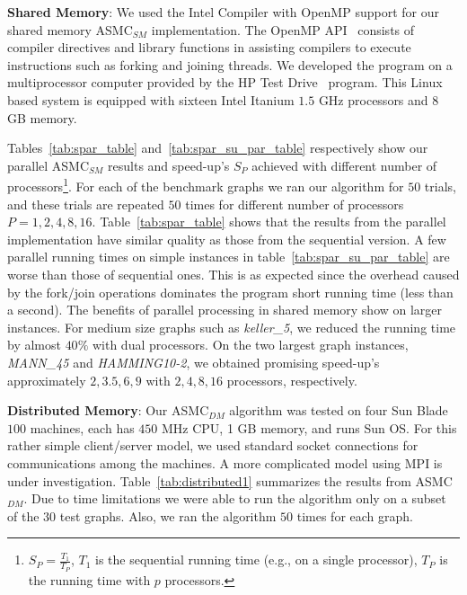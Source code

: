 \documentclass[11pt]{article}
\begin{document}
\textbf{Shared Memory}: We used the Intel Compiler with OpenMP support for our shared memory ASMC$_{SM}$ implementation. The OpenMP API~\cite{OpenMP} consists of compiler directives and library functions in assisting compilers to execute instructions such as forking and joining threads.  We developed the program on a multiprocessor computer provided by the HP Test Drive~\cite{HPTestDrive} program. This Linux based system is equipped with sixteen Intel Itanium $1.5$ GHz processors and $8$ GB memory.


Tables~\ref{tab:spar_table} and~\ref{tab:spar_su_par_table} respectively show our parallel ASMC$_{SM}$ results and speed-up's $S_P$ achieved with different number of processors\footnote{$S_P = \frac{T_1}{T_P}$, $T_1$ is the sequential running time (e.g., on a single processor), $T_P$ is the running time with $p$ processors.}. For each of the benchmark graphs we ran our algorithm for $50$ trials, and these trials are repeated $50$ times for different number of processors $P=1,2,4,8,16$.  Table~\ref{tab:spar_table} shows that the results from the parallel implementation have similar quality as those from the sequential version.  A few parallel running times on simple instances in table~\ref{tab:spar_su_par_table} are worse than those of sequential ones. This is as expected since the overhead caused by the fork/join operations dominates the program short running time (less than a second).  The benefits of parallel processing in shared memory show on larger instances.  For medium size graphs such as \textit{keller\_5}, we reduced the running time by almost $40\%$ with dual processors.  On the two largest graph instances, \textit{MANN\_45} and \textit{HAMMING10-2}, we obtained promising speed-up's approximately $2, 3.5, 6, 9$ with $2,4,8,16$ processors, respectively.  %


\textbf{Distributed Memory}: Our ASMC$_{DM}$ algorithm was tested on four Sun Blade $100$ machines, each has $450$ MHz CPU, 1 GB memory, and runs Sun OS.  For this rather simple client/server model, we used standard socket connections for communications among the machines.  A more complicated model using MPI is under investigation.   Table~\ref{tab:distributed1} summarizes the results from ASMC$_{DM}$. Due to time limitations we were able to run the algorithm only on a subset of the $30$ test graphs.  Also, we ran the algorithm $50$ times for each graph.
\end{document}
